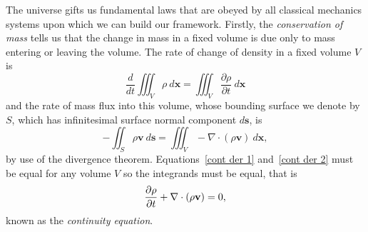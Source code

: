 The universe gifts us fundamental laws that are obeyed by all classical mechanics systems upon which we can build our framework. Firstly, the \textit{conservation of mass} tells us that the change in mass in a fixed volume is due only to mass entering or leaving the volume. The rate of change of density in a fixed volume $V$ is
\begin{equation}
	\frac{d}{dt} \iiint_V \rho ~d\mathbf{x} = \iiint_V \frac{\partial\rho}{\partial t} ~d\mathbf{x} \label{cont der 1}
\end{equation}
and the rate of mass flux into this volume, whose bounding surface we denote by $S$, which has infinitesimal surface normal component $d\mathbf{s}$, is
\begin{equation}
	-\iint_S \rho \mathbf{v} ~d\mathbf{s} = \iiint_V -\nabla\cdot(\rho\mathbf{v}) ~d\mathbf{x}, \label{cont der 2}
\end{equation}
by use of the divergence theorem. Equations~\eqref{cont der 1} and~\eqref{cont der 2} must be equal for any volume $V$ so the integrands must be equal, that is
\begin{equation}
	\frac{\partial\rho}{\partial t} + \nabla\cdot(\rho \mathbf{v}) = 0, \label{cont eqn}
\end{equation}
known as the \textit{continuity equation}.

